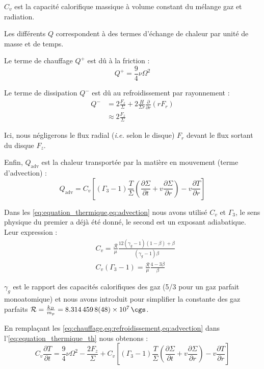$C_v$ est la capacité calorifique massique à volume constant du mélange gaz et
radiation.

Les différents $Q$ correspondent à des termes d’échange de chaleur par unité de
masse et de temps.

Le terme de chauffage $Q^+$ est dû à la friction :
\begin{equation}
    \label{eq:chauffage}
    Q^+ = \frac{9}{4} \nu \Omega^2
\end{equation}

Le terme de dissipation $Q^-$ est dû au refroidissement par rayonnement :
\begin{align}
    Q^- &= 2 \frac{F_z}{\Sigma} + 2 \frac{H}{\Sigma r} \frac{\partial}{\partial r} \left(r F_r\right) \\
    \label{eq:refroidissement}
        &\approx 2 \frac{F_z}{\Sigma}
\end{align}

Ici, nous négligerons le flux radial (\textit{i.e.} selon le disque) $F_r$
devant le flux sortant du disque $F_z$.

Enfin, $Q_\mathrm{adv}$ est la chaleur transportée par la matière en mouvement
(terme d’advection) : 
\begin{equation}
    \label{eq:advection}
    Q_\mathrm{adv} = C_v \left[ (\Gamma_{3} - 1) \frac{T}{\Sigma} \left( \frac{\partial \Sigma}{\partial t} + v \frac{\partial \Sigma}{\partial r}  \right) - v \frac{\partial T}{\partial r} \right]
\end{equation}

Dans les \cref{eq:equation_thermique,eq:advection} nous avons utilisé $C_v$ et
$\Gamma_3$, le sens physique du premier a déjà été donné, le second est un
exposant adiabatique. Leur expression :
\begin{align}
    &C_v = \frac{\mathcal{R}}{\mu} \frac{12 (\gamma_g - 1)(1 - \beta) + \beta}{(\gamma_g - 1) \beta} \\
    &C_v (\Gamma_{3} - 1) = \frac{\mathcal{R}}{\mu} \frac{4 - 3\beta}{\beta}
\end{align}

$\gamma_g$ est le rapport des capacités calorifiques des gaz (5/3 pour un gaz
parfait monoatomique) et nous avons introduit pour simplifier la constante des
gaz parfaits $\mathcal{R} = \frac{k_B}{m_p} = \SI{8.3144598(48)d7}{\cgs}$.

En remplaçant les \cref{eq:chauffage,eq:refroidissement,eq:advection} dans
l’\cref{eq:equation_thermique_th} nous obtenons :
\begin{equation}
    \label{eq:equation_thermique}
    C_v \frac{\partial T}{\partial t} = \frac{9}{4} \nu \Omega^2 - \frac{2 F_z}{\Sigma} + C_v \left[ (\Gamma_{3} - 1) \frac{T}{\Sigma} \left( \frac{\partial \Sigma}{\partial t} + v \frac{\partial \Sigma}{\partial r} \right) - v \frac{\partial T}{\partial r} \right]
\end{equation}

